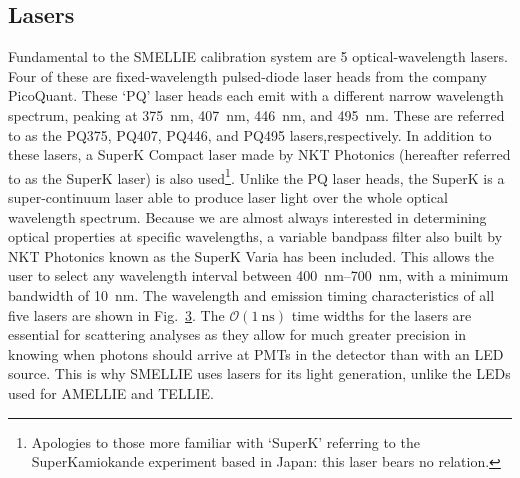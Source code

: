 \subsection{Lasers}\label{sec:smellie_lasers}
Fundamental to the SMELLIE calibration system are 5 optical-wavelength lasers. Four of these are fixed-wavelength pulsed-diode laser heads from the company PicoQuant. These `PQ' laser heads each emit with a different narrow wavelength spectrum, peaking at \SI{375}{\nm}, \SI{407}{\nm}, \SI{446}{\nm}, and \SI{495}{\nm}. These are referred to as the PQ375, PQ407, PQ446, and PQ495 lasers,respectively. In addition to these lasers, a SuperK Compact laser made by NKT Photonics (hereafter referred to as the SuperK laser) is also used\footnote{
    Apologies to those more familiar with `SuperK' referring to the SuperKamiokande experiment based in Japan: this laser bears no relation.
}. Unlike the PQ laser heads, the SuperK is a super-continuum laser able to produce laser light over the whole optical wavelength spectrum. Because we are almost always interested in determining optical properties at specific wavelengths, a variable bandpass filter also built by NKT Photonics known as the SuperK Varia has been included. This allows the user to select any wavelength interval between \SIrange{400}{700}{\nm}, with a minimum bandwidth of \SI{10}{\nm}. The wavelength and emission timing characteristics of all five lasers are shown in Fig.~\ref{fig:smellie_emission_wav_timing}. The $\mathcal{O}(\SI{1}{\ns})$ time widths for the lasers are essential for scattering analyses as they allow for much greater precision in knowing when photons should arrive at PMTs in the detector than with an LED source. This is why SMELLIE uses lasers for its light generation, unlike the LEDs used for AMELLIE and TELLIE.

\begin{figure}
    \centering
    \begin{subfigure}{0.98\textwidth}
        \centering
        \caption{}
        \label{fig:smellie_emission_wavelengths}
    \end{subfigure}
    \begin{subfigure}{0.98\textwidth}
        \centering
        \caption{}
        \label{fig:smellie_emission_timing}
    \end{subfigure}
    \caption{}
    \label{fig:smellie_emission_wav_timing}
\end{figure}

